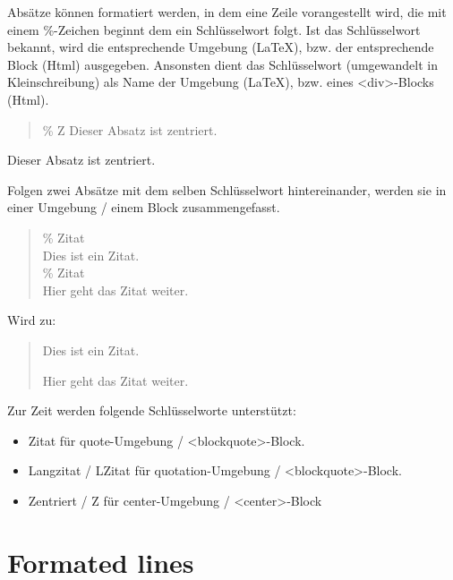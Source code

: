 \documentclass{scrartcl}
\begin{document}
Absätze können formatiert werden, in dem eine Zeile
vorangestellt wird, die mit einem \%-Zeichen beginnt dem ein
Schlüsselwort folgt. Ist das Schlüsselwort bekannt, wird
die entsprechende Umgebung (LaTeX), bzw. der entsprechende
Block (Html) ausgegeben. Ansonsten dient das Schlüsselwort
(umgewandelt in Kleinschreibung) als Name der Umgebung
(LaTeX), bzw. eines <div>-Blocks (Html).

\begin{quote}
	\% Z
	Dieser Absatz ist zentriert.

\end{quote}

\begin{center}
Dieser Absatz ist zentriert.

\end{center}

Folgen zwei Absätze mit dem selben Schlüsselwort
hintereinander, werden sie in einer Umgebung / einem Block
zusammengefasst.

\begin{quote}
  \% Zitat\\
  Dies ist ein Zitat.\\

  \% Zitat\\
  Hier geht das Zitat weiter.\\

\end{quote}

Wird zu:

\begin{quote}
Dies ist ein Zitat.

Hier geht das Zitat weiter.

\end{quote}

Zur Zeit werden folgende Schlüsselworte unterstützt:

\begin{itemize}

\item Zitat für quote-Umgebung / <blockquote>-Block.
\item Langzitat / LZitat für quotation-Umgebung / <blockquote>-Block.
\item Zentriert / Z für center-Umgebung / <center>-Block

\end{itemize}

\section{Formated lines}
\end{document}
